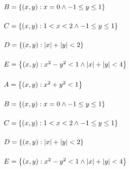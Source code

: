 \documentclass[]{article}
\begin{document}
\subsubsection{$B = \qty{(x,y) : x = 0 \land -1 \leq y \leq 1}$}
\subsubsection{$C = \qty{(x,y) : 1 < x < 2 \land -1 \leq y \leq 1}$}
\subsubsection{$D = \qty{(x,y) : \abs{x} + \abs{y} < 2}$}
\subsubsection{$E = \qty{(x,y) : x^2 - y^2 < 1 \land \abs{x} + \abs{y} < 4}$}


\subsubsection{$A = \qty{(x,y) : x^2 + y^2 < 1}$}
\subsubsection{$B = \qty{(x,y) : x = 0 \land -1 \leq y \leq 1}$}
\subsubsection{$C = \qty{(x,y) : 1 < x < 2 \land -1 \leq y \leq 1}$}
\subsubsection{$D = \qty{(x,y) : \abs{x} + \abs{y} < 2}$}
\subsubsection{$E = \qty{(x,y) : x^2 - y^2 < 1 \land \abs{x} + \abs{y} < 4}$}
\end{document}
